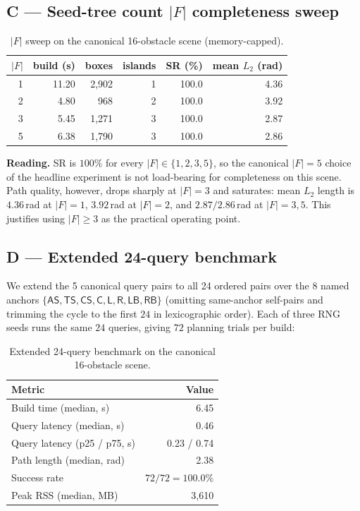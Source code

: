 \documentclass[journal]{IEEEtran}
\begin{document}
\subsection{C — Seed-tree count $|F|$ completeness sweep}
\label{app:c_forest}

\begin{table}[ht]
\centering
\small
\caption{$|F|$ sweep on the canonical 16-obstacle scene (memory-capped).}
\label{tab:forest_size_supp}
\begin{tabular}{@{}rrrrrr@{}}
\toprule
$|F|$ & build (s) & boxes & islands & SR (\%) & mean $L_2$ (rad) \\
\midrule
1 & 11.20 & 2{,}902 & 1 & 100.0 & 4.36 \\
2 & 4.80  & 968    & 2 & 100.0 & 3.92 \\
3 & 5.45  & 1{,}271 & 3 & 100.0 & 2.87 \\
5 & 6.38  & 1{,}790 & 3 & 100.0 & 2.86 \\
\bottomrule
\end{tabular}
\end{table}

\noindent\textbf{Reading.}
SR is $100\%$ for every $|F|\in\{1,2,3,5\}$, so the canonical $|F|{=}5$
choice of the headline experiment is not load-bearing for completeness
on this scene. Path quality, however, drops sharply at $|F|{=}3$
and saturates: mean $L_2$ length is $4.36$\,rad at $|F|{=}1$,
$3.92$\,rad at $|F|{=}2$, and $2.87/2.86$\,rad at $|F|{=}3,5$.
This justifies using $|F|\geq 3$ as the practical operating point.

\subsection{D — Extended 24-query benchmark}
\label{app:d_query}

We extend the 5 canonical query pairs to all 24 ordered pairs over the
8 named anchors $\{\textsf{AS}, \textsf{TS}, \textsf{CS},
\textsf{C}, \textsf{L}, \textsf{R}, \textsf{LB}, \textsf{RB}\}$
(omitting same-anchor self-pairs and trimming the cycle to the first
$24$ in lexicographic order). Each of three RNG seeds runs the same
$24$ queries, giving $72$ planning trials per build:

\begin{table}[ht]
\centering
\small
\caption{Extended 24-query benchmark on the canonical 16-obstacle scene.}
\label{tab:query_bench_supp}
\begin{tabular}{@{}lr@{}}
\toprule
Metric & Value \\
\midrule
Build time (median, s)              & 6.45 \\
Query latency (median, s)           & 0.46 \\
Query latency (p25 / p75, s)        & 0.23 / 0.74 \\
Path length (median, rad)           & 2.38 \\
Success rate                        & $72/72 = 100.0\%$ \\
Peak RSS (median, MB)               & 3{,}610 \\
\bottomrule
\end{tabular}
\end{table}
\end{document}
